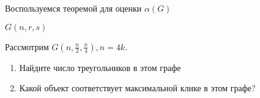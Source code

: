 Воспользуемся теоремой для оценки $ \alpha(G) $ 


$ G(n, r, s) $ 

\begin{brainer}
	Рассмотрим $ G(n, \frac{n}{2}, \frac{n}{4}), n = 4k $.
	\begin{enumerate} \renewcommand{\theenumi}{\arabic{enumi}}
		\item Найдите число треугольников в этом графе
		\item Какой объект соответствует максимальной клике в этом графе?
	\end{enumerate}
\end{brainer}









